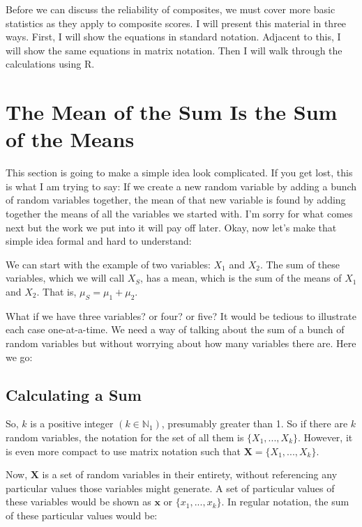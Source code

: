 \documentclass[nohyper,justified,marginals=raggedright]{tufte-book}\usepackage[]{graphicx}\usepackage[]{color}
\newcommand{\bs}[1]{\boldsymbol{#1}}
\begin{document}
Before we can discuss the reliability of composites, we must cover more basic statistics as they apply to composite scores. I will present this material in three ways. First, I will show the equations in standard notation. Adjacent to this, I will show the same equations in matrix notation. Then I will walk through the calculations using R.

\section{The Mean of the Sum Is the Sum of the Means}

This section is going to make a simple idea look complicated. If you get lost, this is what I am trying to say: If we create a new random variable by adding a bunch of random variables together, the mean of that new variable is found by adding together the means of all the variables we started with. I'm sorry for what comes next but the work we put into it will pay off later. Okay, now let's make that simple idea formal and hard to understand: 

We can start with the example of two variables: $X_1$ and $X_2$. The sum of these variables, which we will call $X_S$, has a mean, which is the sum of the means of $X_1$ and $X_2$. That is, $\mu_{S} = \mu_{1} + \mu_{2}$. 

What if we have three variables? or four? or five? It would be tedious to illustrate each case one-at-a-time. We need a way of talking about the sum of a bunch of random variables but without worrying about how many variables there are. Here we go:

\subsection{Calculating a Sum}

So, $k$ is a positive integer $(k \in \mathbb{N}_1)$, presumably greater than 1. So if there are $k$ random variables, the notation for the set of all them is $\{X_1,...,X_k\}$. However, it is even more compact to use matrix notation such that $\boldsymbol{X}=\{X_1,...,X_k\}$.

Now, $\bs{X}$ is a set of random variables in their entirety, without referencing any particular values those variables might generate. A set of particular values of these variables would be shown as $\bs{x}$ or $\{x_1,...,x_k\}$. In regular notation, the sum of these particular values would be:
\end{document}
